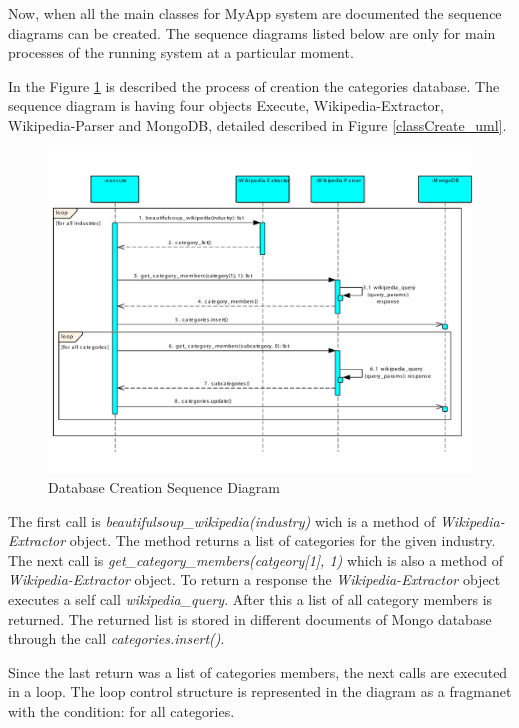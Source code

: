 Now, when all the main classes for MyApp system are documented the sequence diagrams can be created. The sequence diagrams listed below are only for main processes of the running system at a particular moment. 

In the Figure \ref{createDB_uml} is described the process of creation the categories database. The sequence diagram is having four objects Execute, Wikipedia-Extractor, Wikipedia-Parser and MongoDB, detailed described in Figure \ref{classCreate_uml}.

\begin{figure}[!ht]
\centering
\includegraphics[width=16cm]{CreateDB}
\caption{Database Creation Sequence Diagram}\label{createDB_uml}
\end{figure}

The first call is \textit{beautifulsoup\_wikipedia(industry)} wich is a method of \textit{Wikipedia-Extractor} object. The method returns a list of categories for the given industry. The next call is \textit{get\_category\_members(catgeory[1], 1)} which is also a method of \textit{Wikipedia-Extractor} object. To return a response the \textit{Wikipedia-Extractor} object executes a self call \textit{wikipedia\_query}. After this a list of all category members is returned. The returned list is stored in different documents of Mongo database through the call \textit{categories.insert()}.

Since the last return was a list of categories members, the next calls are executed in a loop. The loop control structure is represented in the diagram as a fragmanet with the condition: for all categories. 

